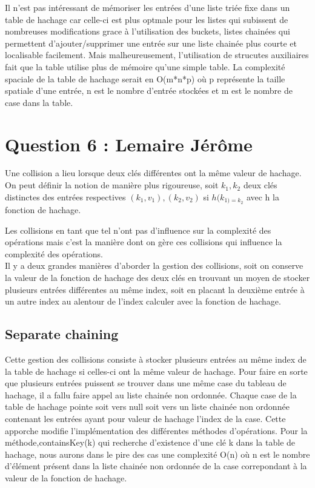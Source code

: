 \documentclass[10pt,a4paper]{article}
\begin{document}
Il n'est pas intéressant de mémoriser les entrées d'une liste triée fixe dans un table de hachage car celle-ci est plus optmale pour les listes qui subissent de nombreuses modifications grace à l'utilisation des buckets, listes chainées qui permettent d'ajouter/supprimer une entrée sur une liste chainée plus courte et localisable facilement. Mais malheureusement, l'utilisation de strucutes auxiliaires fait que la table utilise plus de mémoire qu'une simple table. La complexité spaciale de la table de hachage serait en O(m*n*p) où p représente la taille spatiale d'une entrée, n est le nombre d'entrée stockées et m est le nombre de case dans la table. 
 

\section*{Question 6 : Lemaire Jérôme}

Une collision a lieu lorsque deux clés différentes ont la même valeur de hachage. On peut définir la notion de manière plus rigoureuse, soit $ k_{1}, k_{2} $ deux clés distinctes des entrées respectives $ (k_{1},v_{1}),(k_{2},v_{2}) $ si $ h(k_{1) = k_{2}} $ avec h la fonction de hachage.

Les collisions en tant que tel n'ont pas d'influence sur la complexité des opérations mais c'est la manière dont on gère ces collisions qui influence la complexité des opérations.\\
Il y a deux grandes manières d'aborder la gestion des collisions, soit on conserve la valeur de la fonction de hachage des deux clés en trouvant un moyen de stocker plusieurs entrées différentes au même index, soit en placant la deuxième entrée à un autre index au alentour de l'index calculer avec la fonction de hachage.\\

\subsection*{Separate chaining}

Cette gestion des collisions consiste à stocker plusieurs entrées au même index de la table de hachage si celles-ci ont la même valeur de hachage. Pour faire en sorte que plusieurs entrées puissent se trouver dans une même case du tableau de hachage, il a fallu faire appel au liste chainée non ordonnée. Chaque case de la table de hachage pointe soit vers null soit vers un liste chainée non ordonnée contenant les entrées ayant pour valeur de hachage l'index de la case. 
Cette apporche modifie l'implémentation des différentes méthodes d'opérations. Pour la méthode,containsKey(k) qui recherche d'existence d'une clé k dans la table de hachage, nous aurons dans le pire des cas une complexité O(n) où n est le nombre d'élément présent dans la liste chainée non ordonnée de la case correpondant à la valeur de la fonction de hachage. 
\end{document}
